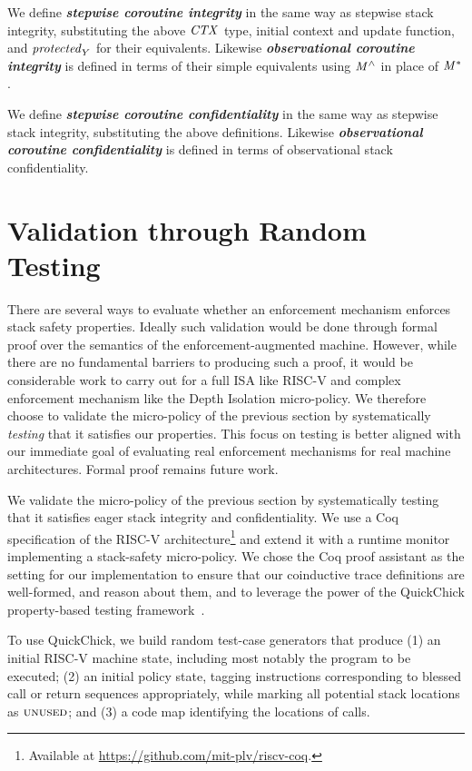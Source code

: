 \documentclass[10pt,conference]{ieeetran}%
\theoremstyle{definition}
\begin{document}
{
We define \textbf{\em stepwise coroutine integrity} in the same way as stepwise stack integrity,
substituting the above \(\mathit{CTX}\) type, initial context and update
function, and \(\mathit{protected}_Y\) for their equivalents. Likewise
\textbf{\em observational coroutine integrity} is defined
in terms of their simple equivalents using \(\mathit{M}^\wedge\) in place of \(\mathit{M}^*\).

We define \textbf{\em stepwise coroutine confidentiality} in the same way as stepwise stack
integrity, substituting the above definitions. Likewise
\textbf{\em observational coroutine confidentiality} is defined in terms of observational
stack confidentiality.

\section{Validation through Random Testing}
\label{sec:testing}

There are several ways to evaluate whether an enforcement mechanism enforces
stack safety properties. Ideally such validation would be done through formal proof over
the semantics of the enforcement-augmented machine.
However, while there are no fundamental barriers to producing such a proof,
it would be considerable work to carry out for a full ISA like RISC-V and
complex enforcement mechanism like the Depth Isolation micro-policy.
We therefore choose to validate the micro-policy of the previous section by
systematically \emph{testing} that it satisfies our properties.
This focus on testing is better aligned with our immediate
goal of evaluating real enforcement mechanisms for real machine architectures.
Formal proof remains future work.

We validate the micro-policy of the previous section by
systematically testing that it satisfies eager stack integrity and
confidentiality. We use a Coq specification of the RISC-V
architecture\footnote{Available at
  \url{https://github.com/mit-plv/riscv-coq}.}
and extend it with a runtime monitor implementing a stack-safety
micro-policy. We chose the Coq proof assistant as the setting for our implementation
to ensure that our coinductive trace definitions are well-formed, and reason about
them, and to leverage the power of the QuickChick property-based testing framework~\cite{Pierce:SF4}.

To use QuickChick, we build random test-case generators that produce
(1) an initial RISC-V machine state, including most notably
  the program to be executed;
(2)
  an initial policy state, tagging instructions corresponding to
  blessed call or return sequences appropriately, while marking
  all potential stack locations as $\textsc{unused}$; and
(3)
 a code map identifying the locations of calls.

}
\end{document}
